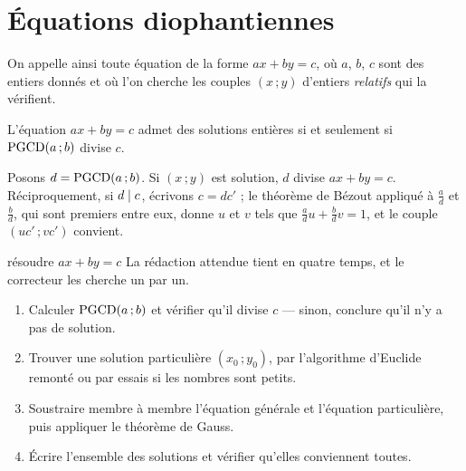 \section{Équations diophantiennes}

\begin{definition}
On appelle ainsi toute équation de la forme $ax+by = c$, où $a$, $b$, $c$ sont
des entiers donnés et où l'on cherche les couples $(x\,;y)$ d'entiers
\emph{relatifs} qui la vérifient.
\end{definition}

\begin{theoreme}
L'équation $ax+by = c$ admet des solutions entières si et seulement si
$\operatorname{PGCD}(a\,;b)$ divise $c$.
\end{theoreme}

\begin{demonstration}
Posons $d = \operatorname{PGCD}(a\,;b)$. Si $(x\,;y)$ est solution, $d$ divise $ax+by = c$.
Réciproquement, si $d \mid c$, écrivons $c = dc'$ ; le théorème de Bézout
appliqué à $\frac ad$ et $\frac bd$, qui sont premiers entre eux, donne $u$ et
$v$ tels que $\frac ad u+\frac bd v = 1$, et le couple $(uc'\,;vc')$ convient.
\end{demonstration}

\begin{methode}{résoudre $ax+by = c$}
La rédaction attendue tient en quatre temps, et le correcteur les cherche un
par un.
\begin{enumerate}[label=\textbf{\arabic*.}, leftmargin=*, itemsep=0.15em]
  \item Calculer $\operatorname{PGCD}(a\,;b)$ et vérifier qu'il divise $c$ — sinon,
        conclure qu'il n'y a pas de solution.
  \item Trouver une solution particulière $(x_{0}\,;y_{0})$, par
        l'algorithme d'Euclide remonté ou par essais si les nombres sont
        petits.
  \item Soustraire membre à membre l'équation générale et l'équation
        particulière, puis appliquer le théorème de Gauss.
  \item Écrire l'ensemble des solutions et vérifier qu'elles conviennent
        toutes.
\end{enumerate}
\end{methode}


